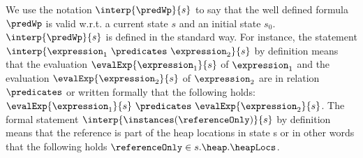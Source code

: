  We use the notation $\interp{\predWp}{s}$ to say that the well defined formula  $\predWp$ is valid w.r.t. a current state  $s$ and an initial state $s_0$.
 $\interp{\predWp}{s}$ is defined in the standard way. For instance, the statement $\interp{\expression_1 \  \predicates \  \expression_2 }{s}$
 by definition means that the evaluation   $\evalExp{ \expression_1 }{s } $ of $\expression_1$ and the evaluation $\evalExp{ \expression_2 }{s } $ of $\expression_2$
 are in relation $ \predicates$ or written formally that the following holds:
 $\evalExp{ \expression_1 }{s } \ \predicates \ \evalExp{ \expression_2 }{s}$.
 The formal statement   $\interp{\instances(\referenceOnly)}{s}$  by definition means that the reference  is part of the heap locations in state s or in other words 
 that the following holds  $\referenceOnly \in s.\heap.\heapLocs $.

 




